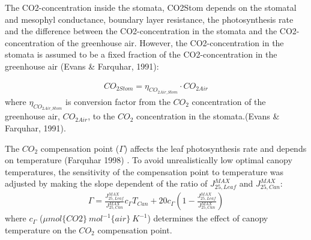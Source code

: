 \documentclass[a4paper]{article}
\numberwithin{equation}{section}
\begin{document}
The CO2-concentration inside the stomata, CO2Stom depends on the stomatal and mesophyl conductance, boundary layer resistance, the photosynthesis rate and the difference between the CO2-concentration in the stomata and the CO2-concentration of the greenhouse air. However, the CO2-concentration in the stomata is assumed to be a fixed fraction of the CO2-concentration in the greenhouse air (Evans \& Farquhar, 1991):

\begin{align}
  CO_{2Stom} = \eta_{CO_{2Air\_Stom}} \cdot CO_{2Air}
\end{align}
where \(\eta_{CO_{2Air\_Stom}}\) is conversion factor from the \(CO_2\) concentration of the greenhouse air, \(CO_{2Air}\), to the \(CO_2\) concentration in the stomata.(Evans \& Farquhar, 1991).

The \(CO_2\) compensation point (\(\Gamma\)) affects the leaf photosynthesis rate and depends on temperature (Farquhar 1998) . To avoid unrealistically low optimal canopy temperatures, the sensitivity of the compensation point to temperature was adjusted by making the slope dependent of the ratio of \(J^{MAX}_{25,Leaf}\) and \(J^{MAX}_{25,Can}\):
\begin{align}
  \Gamma = \frac{J^{MAX}_{25,Leaf}}{J^{MAX}_{25,Can}}c_{\Gamma} T_{Can} + 20 c_{\Gamma} \left(1-\frac{J^{MAX}_{25,Leaf}}{J^{MAX}_{25,Can}}\right)
\end{align}
where \(c_{\Gamma}\) (\(\mu mol\{CO2\}\ mol^{-1}\{air\}\ K^{-1}\)) determines the effect of canopy temperature on the \(CO_2\) compensation point.






\end{document}
